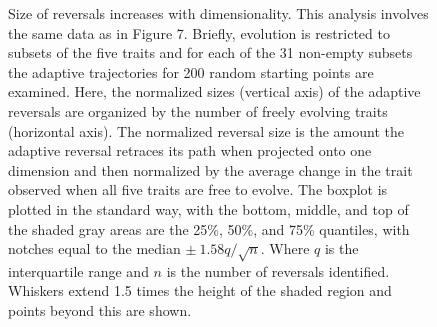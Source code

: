 \documentclass[pdftex,12pt,titlepage]{article}
\begin{document}
\begin{figure}[p]
\begin{center}
\caption{Size of reversals increases with dimensionality. This analysis involves the same data as in Figure 7. Briefly, evolution is restricted to subsets of the five traits and for each of the 31 non-empty subsets the adaptive trajectories for 200 random starting points are examined. Here, the normalized sizes (vertical axis) of the adaptive reversals are organized by the number of freely evolving traits (horizontal axis). The normalized reversal size is the amount the adaptive reversal retraces its path when projected onto one dimension and then normalized by the average change in the trait observed when all five traits are free to evolve. The boxplot is plotted in the standard way, with the bottom, middle, and top of the shaded gray areas are the 25\%, 50\%, and 75\% quantiles, with notches equal to the median $\pm\ 1.58 q/\sqrt{n}$. Where $q$ is the interquartile range and $n$ is the number of reversals identified. Whiskers extend 1.5 times the height of the shaded region and points beyond this are shown.}
\label{RevSizes}
\end{center}
\end{figure}
\clearpage
\end{document}
